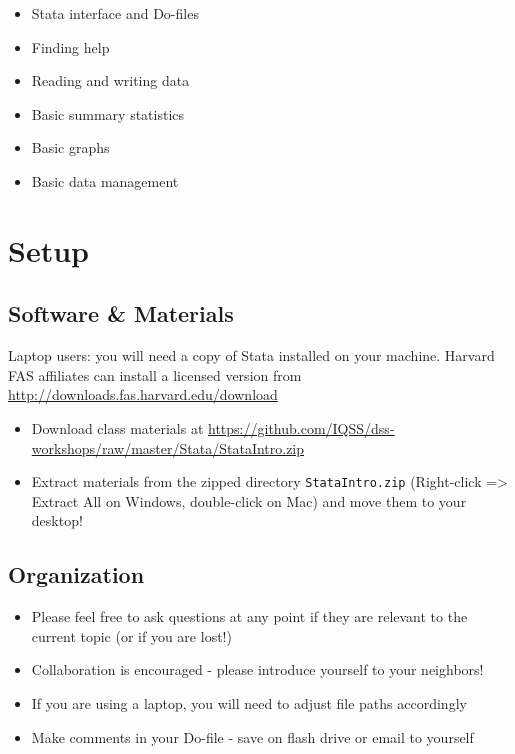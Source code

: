 \documentclass[
]{book}
\providecommand{\tightlist}{%
  \setlength{\itemsep}{0pt}\setlength{\parskip}{0pt}}
\begin{document}
\begin{itemize}
\tightlist
\item
  Stata interface and Do-files
\item
  Finding help
\item
  Reading and writing data
\item
  Basic summary statistics
\item
  Basic graphs
\item
  Basic data management
\end{itemize}

\hypertarget{setup-6}{%
\section{Setup}\label{setup-6}}

\hypertarget{software-materials}{%
\subsection{Software \& Materials}\label{software-materials}}

Laptop users: you will need a copy of Stata installed on your machine.
Harvard FAS affiliates can install a licensed version from \url{http://downloads.fas.harvard.edu/download}

\begin{itemize}
\tightlist
\item
  Download class materials at \url{https://github.com/IQSS/dss-workshops/raw/master/Stata/StataIntro.zip}
\item
  Extract materials from the zipped directory \texttt{StataIntro.zip} (Right-click =\textgreater{} Extract All on Windows, double-click on Mac) and move them to your desktop!
\end{itemize}

\hypertarget{organization}{%
\subsection{Organization}\label{organization}}

\begin{itemize}
\tightlist
\item
  Please feel free to ask questions at any point if they are relevant to the current topic (or if you are lost!)
\item
  Collaboration is encouraged - please introduce yourself to your neighbors!
\item
  If you are using a laptop, you will need to adjust file paths accordingly
\item
  Make comments in your Do-file - save on flash drive or email to yourself
\end{itemize}
\end{document}
